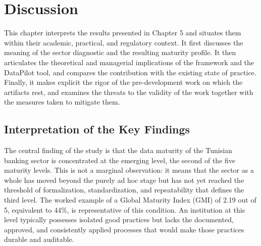 
\section{Discussion}

This chapter interprets the results presented in Chapter 5 and situates them within their academic, practical, and regulatory context. It first discusses the meaning of the sector diagnostic and the resulting maturity profile. It then articulates the theoretical and managerial implications of the framework and the DataPilot tool, and compares the contribution with the existing state of practice. Finally, it makes explicit the rigor of the pre-development work on which the artifacts rest, and examines the threats to the validity of the work together with the measures taken to mitigate them.

\subsection{Interpretation of the Key Findings}

The central finding of the study is that the data maturity of the Tunisian banking sector is concentrated at the emerging level, the second of the five maturity levels. This is not a marginal observation: it means that the sector as a whole has moved beyond the purely ad hoc stage but has not yet reached the threshold of formalization, standardization, and repeatability that defines the third level. The worked example of a Global Maturity Index (GMI) of 2.19 out of 5, equivalent to 44\%, is representative of this condition. An institution at this level typically possesses isolated good practices but lacks the documented, approved, and consistently applied processes that would make those practices durable and auditable.

